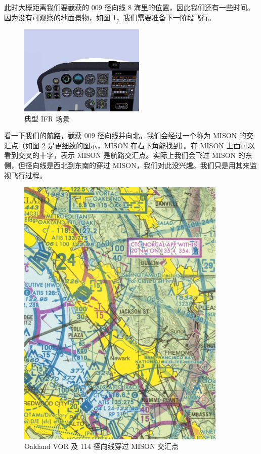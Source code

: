 此时大概距离我们要截获的 009 径向线 8 海里的位置，因此我们还有一些时间。因为没有可观察的地面景物，如图 \ref{fig:murk}，我们需要准备下一阶段飞行。

\begin{figure}
  \begin{center}
    \includegraphics[width=6cm]{img/murk}
    \caption{典型 IFR 场景}
    \label{fig:murk}
  \end{center}
\end{figure}

看一下我们的航路，截获 009 径向线并向北，我们会经过一个称为 MISON 的交汇点（如图 \ref{fig:Oakland} 是更细致的图示，MISON 在右下角能找到）。在 MISON 上面可以看到交叉的十字，表示 MISON 是航路交汇点。实际上我们会飞过 MISON 的东侧，但径向线是西北到东南的穿过 MISON，我们对此没兴趣。我们只是用其来监视飞行过程。

\begin{figure}
  \begin{center}
    \includegraphics[width=10cm]{img/Oakland}
    \caption{Oakland VOR 及 114 径向线穿过 MISON 交汇点}
    \label{fig:Oakland}
  \end{center}
\end{figure}

